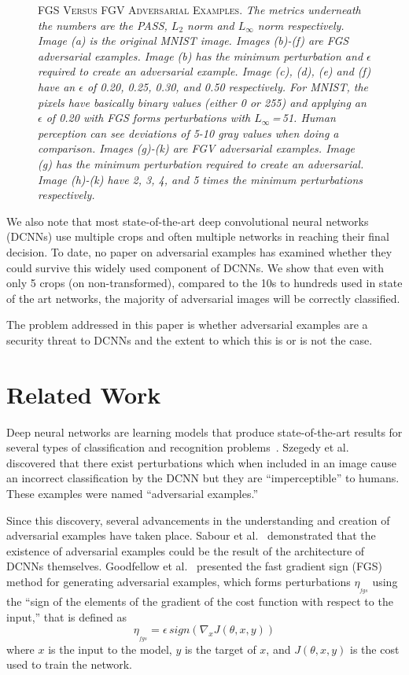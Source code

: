 \documentclass[conference]{IEEEtran}
\renewcommand\cap[3]{\caption[#2]{\label{#1}\textsc{#2}. \small\textit{#3}}}
\begin{document}
\begin{figure*}[t]
\cap{fig:fgs_fgv}{FGS Versus FGV Adversarial Examples}{The metrics underneath the numbers are the PASS, \(L_2\) norm and \(L_\infty\) norm respectively.  Image (a) is the original MNIST image.  Images (b)-(f) are FGS adversarial examples.  Image (b) has the minimum perturbation and \(\epsilon\) required to create an adversarial example.  Image (c), (d), (e) and (f) have an \(\epsilon\) of 0.20, 0.25, 0.30, and 0.50 respectively.  For MNIST, the pixels have basically binary values  (either 0 or 255) and applying an \(\epsilon\) of 0.20 with FGS forms perturbations with $L_\infty$\,=\,51.  Human perception can see deviations of 5-10 gray values when doing a comparison.  Images (g)-(k) are FGV adversarial examples.  Image (g) has the minimum perturbation required to create an adversarial.  Image (h)-(k) have 2, 3, 4, and 5 times the minimum perturbations respectively. }
\end{figure*}


We also note that most state-of-the-art deep convolutional neural networks (DCNNs) use multiple crops and often multiple networks in reaching their final decision.  To date, no paper on adversarial examples has examined whether they could survive this widely used component of DCNNs.  We show that even with only 5 crops (on non-transformed), compared to the 10s to hundreds used in state of the art networks,  the majority of adversarial images will be correctly classified.  \par
The problem addressed in this paper is whether adversarial examples are a security threat to DCNNs and the extent to which this is or is not the case.



\section{Related Work}

Deep neural networks are learning models that produce state-of-the-art results for several types of classification and recognition problems~\cite{c7,c8}. Szegedy et al.~\cite{c4} discovered that there exist perturbations which when included in an image cause an incorrect classification by the DCNN but they are ``imperceptible'' to humans.  These examples were named ``adversarial examples.'' 

Since this discovery, several advancements in the understanding and creation of adversarial examples have taken place. Sabour et al.~\cite{c16} demonstrated that the existence of adversarial examples could be the result of the architecture of DCNNs themselves.  Goodfellow et al.~\cite{c5} presented the fast gradient sign (FGS) method for generating adversarial examples, which forms perturbations $\eta_{_{fgs}}$ using the ``sign of the elements of the gradient of the cost function with respect to the input,'' that is defined as
\begin{equation}
	\label{eq:fgs}
	\eta_{_{fgs}} = \epsilon\,sign(\nabla_xJ(\theta,x,y))
\end{equation}
where \(x\) is the input to the model, \(y\) is the target of \(x\), and \(J(\theta,x,y)\) is the cost used to train the network.\par
\end{document}
